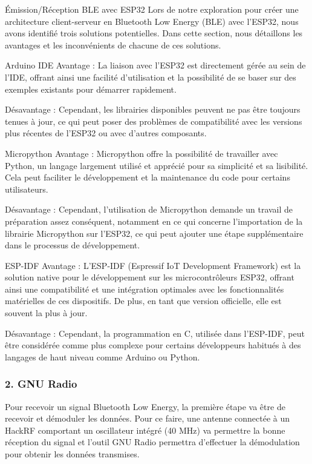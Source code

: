 Émission/Réception BLE avec ESP32 Lors de notre exploration pour créer
une architecture client-serveur en Bluetooth Low Energy (BLE) avec
l'ESP32, nous avons identifié trois solutions potentielles. Dans cette
section, nous détaillons les avantages et les inconvénients de chacune
de ces solutions.

Arduino IDE Avantage : La liaison avec l'ESP32 est directement gérée au
sein de l'IDE, offrant ainsi une facilité d'utilisation et la
possibilité de se baser sur des exemples existants pour démarrer
rapidement.

Désavantage : Cependant, les librairies disponibles peuvent ne pas être
toujours tenues à jour, ce qui peut poser des problèmes de compatibilité
avec les versions plus récentes de l'ESP32 ou avec d'autres composants.

Micropython Avantage : Micropython offre la possibilité de travailler
avec Python, un langage largement utilisé et apprécié pour sa simplicité
et sa lisibilité. Cela peut faciliter le développement et la maintenance
du code pour certains utilisateurs.

Désavantage : Cependant, l'utilisation de Micropython demande un travail
de préparation assez conséquent, notamment en ce qui concerne
l'importation de la librairie Micropython sur l'ESP32, ce qui peut
ajouter une étape supplémentaire dans le processus de développement.

ESP-IDF Avantage : L'ESP-IDF (Espressif IoT Development Framework) est
la solution native pour le développement sur les microcontrôleurs ESP32,
offrant ainsi une compatibilité et une intégration optimales avec les
fonctionnalités matérielles de ces dispositifs. De plus, en tant que
version officielle, elle est souvent la plus à jour.

Désavantage : Cependant, la programmation en C, utilisée dans l'ESP-IDF,
peut être considérée comme plus complexe pour certains développeurs
habitués à des langages de haut niveau comme Arduino ou Python.

\subsubsection{2. GNU Radio}\label{gnu-radio}



Pour recevoir un signal Bluetooth Low Energy, la première étape va être
de recevoir et démoduler les données. Pour ce faire, une antenne
connectée à un HackRF comportant un oscillateur intégré (40 MHz) va
permettre la bonne réception du signal et l'outil GNU Radio permettra
d'effectuer la démodulation pour obtenir les données transmises.

